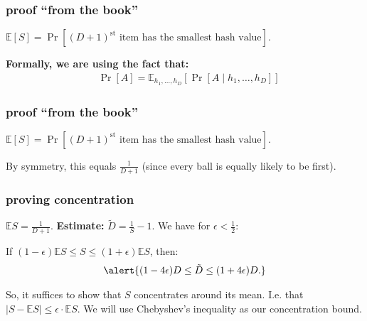 \documentclass[handout,compress]{beamer}
\newcommand{\E}{\mathbb{E}}
\begin{document}
\begin{frame}
	\frametitle{proof ``from the book''}
	$\E[S] = \Pr[(D+1)^\text{st} \text{ item has the smallest hash value}]$.
	\begin{center}
	\end{center}
\textbf{Formally, we are using the fact that:}
	\begin{align*}
		&\Pr[A] = \E_{h_1, \ldots, h_D}\left[\Pr\left[A\mid h_1, \ldots, h_D\right]\right]
	\end{align*}
	
\end{frame}

\begin{frame}
	\frametitle{proof ``from the book''}
	$\E[S] = \Pr[(D+1)^\text{st} \text{ item has the smallest hash value}]$.
	\begin{center}
	\end{center}
	By symmetry, this equals $\frac{1}{D+1}$ (since every ball is equally likely to be first). 
	
\end{frame}


\begin{frame}
	\frametitle{proving concentration}	
	$\E S = \frac{1}{D + 1}$. \textbf{Estimate:} $\tilde{D} = \frac{1}{S} - 1$. We have for $\epsilon < \frac{1}{2}$:
	
	\begin{center}
	If $(1-\epsilon)\E S \leq S \leq (1+\epsilon)\E S$, then:
	\begin{align*}
	\alert{(1-4\epsilon)D \leq \tilde{D} \leq (1+4\epsilon)D.}
	\end{align*}
	\end{center}
\vspace{10em}

	So, it suffices to show that $S$ concentrates around its mean. I.e. that $|S - \E S| \leq \epsilon\cdot\E S$. We will use Chebyshev's inequality as our concentration bound.
\end{frame}
\end{document}
